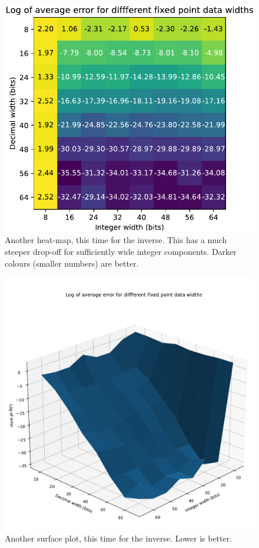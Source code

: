 \documentclass[12pt]{article}
\begin{document}
\begin{figure}[thp]
	\centering
	
	\includegraphics[width=\textwidth]{heatmap_full_inv.pdf}
	
	\caption{Another heat-map, this time for the inverse. This has a much steeper drop-off for sufficiently wide integer components. Darker colours (smaller numbers) are better.}
	\label{full_heat_inv}
\end{figure}

\begin{figure}[thp]
	\centering
	
	\includegraphics[width=\textwidth]{sfc_plot_full_inv.pdf}
	
	\caption{Another surface plot, this time for the inverse. Lower is better.}
	\label{full_sfc_inv}
\end{figure}
\end{document}
